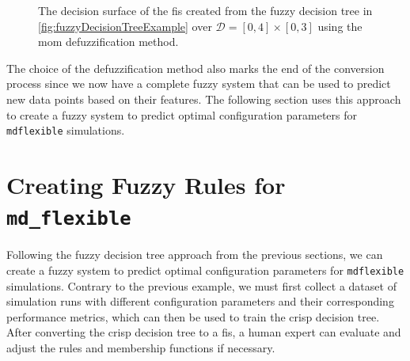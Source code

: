\begin{multicols}{2}
    \columnbreak

    \begin{figure}[H]
        \caption[Decision surface of the fuzzy rules using MOM method]{The decision surface of the  \gls{fis} created from the fuzzy decision tree in \autoref{fig:fuzzyDecisionTreeExample} over $\mathcal{D}=[0,4]\times[0,3]$ using the \gls{mom} defuzzification method.}
        \label{fig:fuzzyDecisionSurfaceExampleMOM}
    \end{figure}
\end{multicols}

\noindent The choice of the defuzzification method also marks the end of the conversion process since we now have a complete fuzzy system that can be used to predict new data points based on their features. The following section uses this approach to create a fuzzy system to predict optimal configuration parameters for \texttt{\gls{mdflexible}} simulations.

\section{Creating Fuzzy Rules for \texttt{md\_flexible}}

Following the fuzzy decision tree approach from the previous sections, we can create a fuzzy system to predict optimal configuration parameters for \texttt{\gls{mdflexible}} simulations. Contrary to the previous example, we must first collect a dataset of simulation runs with different configuration parameters and their corresponding performance metrics, which can then be used to train the crisp decision tree. After converting the crisp decision tree to a \gls{fis}, a human expert can evaluate and adjust the rules and membership functions if necessary.

